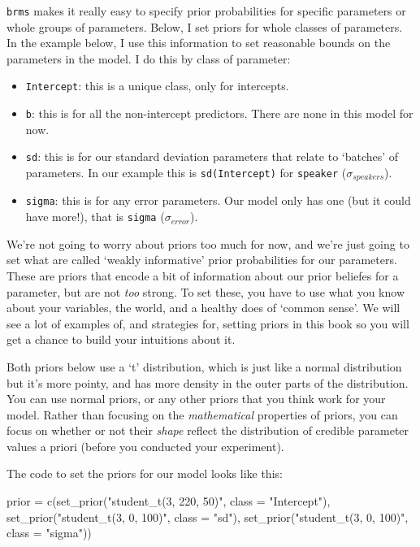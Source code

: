 \documentclass[
]{book}
\newenvironment{Shaded}{\begin{snugshade}}{\end{snugshade}}
\newcommand{\AttributeTok}[1]{\textcolor[rgb]{0.77,0.63,0.00}{#1}}
\newcommand{\FunctionTok}[1]{\textcolor[rgb]{0.00,0.00,0.00}{#1}}
\newcommand{\NormalTok}[1]{#1}
\newcommand{\OtherTok}[1]{\textcolor[rgb]{0.56,0.35,0.01}{#1}}
\newcommand{\StringTok}[1]{\textcolor[rgb]{0.31,0.60,0.02}{#1}}
\providecommand{\tightlist}{%
  \setlength{\itemsep}{0pt}\setlength{\parskip}{0pt}}
\begin{document}
\texttt{brms} makes it really easy to specify prior probabilities for specific parameters or whole groups of parameters. Below, I set priors for whole classes of parameters. In the example below, I use this information to set reasonable bounds on the parameters in the model. I do this by class of parameter:

\begin{itemize}
\tightlist
\item
  \texttt{Intercept}: this is a unique class, only for intercepts.
\item
  \texttt{b}: this is for all the non-intercept predictors. There are none in this model for now.
\item
  \texttt{sd}: this is for our standard deviation parameters that relate to `batches' of parameters. In our example this is \texttt{sd(Intercept)} for \texttt{speaker} (\(\sigma_{speakers}\)).
\item
  \texttt{sigma}: this is for any error parameters. Our model only has one (but it could have more!), that is \texttt{sigma} (\(\sigma_{error}\)).
\end{itemize}

We're not going to worry about priors too much for now, and we're just going to set what are called `weakly informative' prior probabilities for our parameters. These are priors that encode a bit of information about our prior beliefes for a parameter, but are not \emph{too} strong. To set these, you have to use what you know about your variables, the world, and a healthy does of `common sense'. We will see a lot of examples of, and strategies for, setting priors in this book so you will get a chance to build your intuitions about it.

Both priors below use a `t' distribution, which is just like a normal distribution but it's more pointy, and has more density in the outer parts of the distribution. You can use normal priors, or any other priors that you think work for your model. Rather than focusing on the \emph{mathematical} properties of priors, you can focus on whether or not their \emph{shape} reflect the distribution of credible parameter values a priori (before you conducted your experiment).

The code to set the priors for our model looks like this:

\begin{Shaded}
\begin{Highlighting}[]
\NormalTok{  prior }\OtherTok{=} \FunctionTok{c}\NormalTok{(}\FunctionTok{set\_prior}\NormalTok{(}\StringTok{"student\_t(3, 220, 50)"}\NormalTok{, }\AttributeTok{class =} \StringTok{"Intercept"}\NormalTok{),}
            \FunctionTok{set\_prior}\NormalTok{(}\StringTok{"student\_t(3, 0, 100)"}\NormalTok{, }\AttributeTok{class =} \StringTok{"sd"}\NormalTok{),}
            \FunctionTok{set\_prior}\NormalTok{(}\StringTok{"student\_t(3, 0, 100)"}\NormalTok{, }\AttributeTok{class =} \StringTok{"sigma"}\NormalTok{))}
\end{Highlighting}
\end{Shaded}
\end{document}
